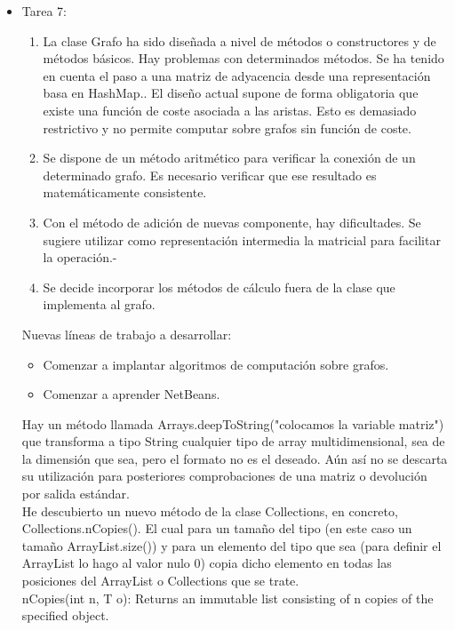 \begin{itemize}
\item Tarea 7:\\
\begin{enumerate}
\item La clase Grafo ha sido diseñada a nivel de métodos o constructores y de métodos básicos. Hay problemas con determinados métodos. Se ha tenido en cuenta el paso a una matriz de adyacencia desde una representación basa en HashMap.. El diseño actual supone de forma obligatoria que existe una función de coste asociada a las aristas. Esto es demasiado restrictivo y no permite computar sobre grafos sin función de coste.
\item Se dispone de un método aritmético para verificar la conexión de un determinado grafo. Es necesario verificar que ese resultado es matemáticamente consistente.
\item Con el método de adición de nuevas componente, hay dificultades. Se sugiere utilizar como representación intermedia la matricial para facilitar la operación.-
\item Se decide incorporar los métodos de cálculo fuera de la clase que implementa al grafo.
\end{enumerate}

Nuevas líneas de trabajo a desarrollar:
\begin{itemize}
\item Comenzar a implantar algoritmos de computación sobre grafos.
\item Comenzar a aprender NetBeans.
\end{itemize}

Hay un método llamada Arrays.deepToString("colocamos la variable matriz") que transforma a tipo String cualquier tipo de array multidimensional, sea de la dimensión que sea, pero el formato no es el deseado. Aún así no se descarta su utilización para posteriores comprobaciones de una matriz o devolución por salida estándar.\\

He descubierto un nuevo método de la clase Collections, en concreto, Collections.nCopies(). El cual para un tamaño del tipo (en este caso un tamaño ArrayList.size()) y para un elemento del tipo que sea (para definir el ArrayList lo hago al valor nulo 0) copia dicho elemento en todas las posiciones del ArrayList o Collections que se trate.\\
nCopies(int n, T o): Returns an immutable list consisting of n copies of the specified object.\\


\end{itemize}
